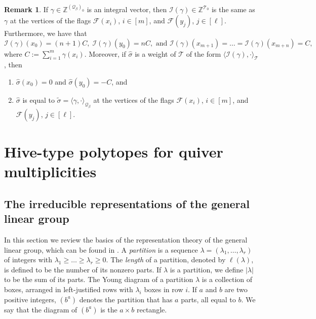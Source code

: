 \documentclass[11pt]{article}
\theoremstyle{definition}
\newtheorem{rema}[theo]{Remark}
\numberwithin{equation}{section}
\newcommand{\ZZ}{\mathbb Z}
\newcommand{\Q}{\mathbf{\mathcal{Q}}}
\newcommand{\I}{\mathcal I }
\newcommand{\F}{\mathcal{F}}
\newcommand{\river}{\mathcal{T}}
\begin{document}
\begin{rema} \label{dim-wts-river-quiver-rmk} If $\gamma \in \ZZ^{(\Q_{\beta})_0}$ is an integral vector,  then $\I(\gamma) \in \ZZ^{\river_0}$ is the same as $\gamma$ at the vertices of the flags $\F(x_i)$, $i \in [m]$, and $\F(y_j)$, $j \in [\ell]$. Furthermore, we have that
$$
\I(\gamma)(x_0)=(n+1)C, \; \I(\gamma)(y_0)=nC, \text{~and~}\I(\gamma)(x_{m+1})=\ldots=\I(\gamma)(x_{m+n})=C,
$$
where $C:=\sum_{i=1}^m \gamma(x_i)$. Moreover, if $\widehat{\sigma}$ is a weight of $\river$ of the form $\langle \I(\gamma), \cdot \rangle_{\river}$, then 
\begin{enumerate}
\item $\widehat{\sigma}(x_0)=0$ and $\widehat{\sigma}(y_0)=-C$, and
\item $\widehat{\sigma}$ is equal to $\widetilde{\sigma}=\langle \gamma, \cdot \rangle_{\Q_\beta}$ at the vertices of the flags $\F(x_i)$, $i \in [m]$, and $\F(y_j)$, $j \in [\ell]$.
\end{enumerate}
\end{rema}

\section{Hive-type polytopes for quiver multiplicities}\label{Hive-poly-semi-inv-sec}

\subsection{The irreducible representations of the general linear group} In this section we review the basics of the representation theory of the general linear group, which can be found in \cite{F3}. A \emph{partition} is a sequence $\lambda = (\lambda_1,\ldots, \lambda_r)$ of integers with $\lambda_1 \geq \ldots \geq \lambda_r \geq 0$. The \emph{length} of a partition, denoted by $\ell(\lambda)$, is defined to be the number of its nonzero parts. If $\lambda$ is a partition, we define $|\lambda|$ to be the sum of its parts. The Young diagram of a partition $\lambda$ is a collection of boxes, arranged in left-justified rows with $\lambda_i$ boxes in row $i$. If $a$ and $b$ are two positive integers, $(b^a)$ denotes the partition that has $a$ parts, all equal to $b$. We say that the diagram of $(b^a)$ is the $a \times b$ rectangle.
\end{document}
